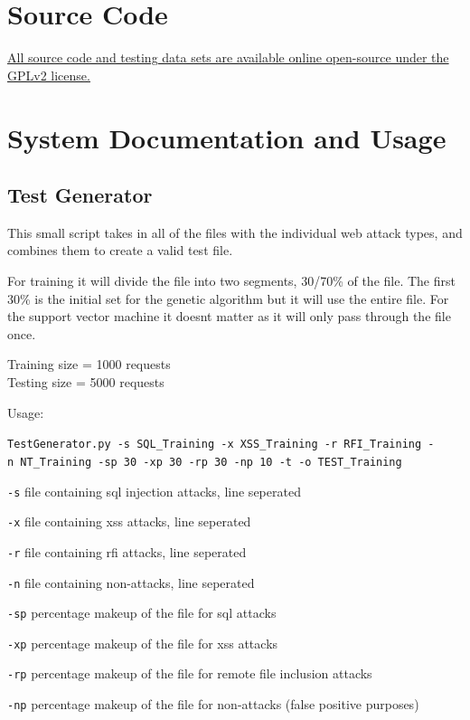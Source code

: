 \begin{appendices}

\chapter{Source Code}

\href{https://github.com/xTVaser/web-threat-thesis}{All source code and testing data sets are available online open-source under the GPLv2 license.}

\chapter{System Documentation and Usage}
\section{Test Generator} \label{app:testGeneratorDocumentation}

This small script takes in all of the files with the individual web
attack types, and combines them to create a valid test file.

For training it will divide the file into two segments, 30/70\% of the
file. The first 30\% is the initial set for the genetic algorithm but it
will use the entire file. For the support vector machine it doesnt
matter as it will only pass through the file once.

Training size = 1000 requests\\
Testing size = 5000 requests

Usage:

\texttt{TestGenerator.py\ -s\ SQL\_Training\ -x\ XSS\_Training\ -r\ RFI\_Training\ -n\ NT\_Training\ -sp\ 30\ -xp\ 30\ -rp\ 30\ -np\ 10\ -t\ -o\ TEST\_Training}

\texttt{-s} file containing sql injection attacks, line seperated

\texttt{-x} file containing xss attacks, line seperated

\texttt{-r} file containing rfi attacks, line seperated

\texttt{-n} file containing non-attacks, line seperated

\texttt{-sp} percentage makeup of the file for sql attacks

\texttt{-xp} percentage makeup of the file for xss attacks

\texttt{-rp} percentage makeup of the file for remote file inclusion
attacks

\texttt{-np} percentage makeup of the file for non-attacks (false
positive purposes)


\end{appendices}
